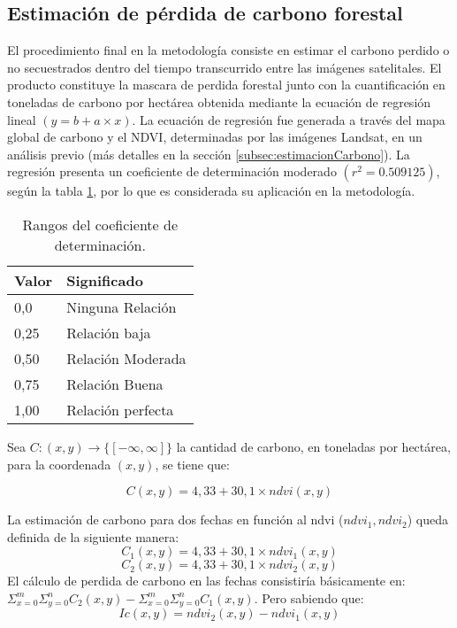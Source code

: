 \subsection{Estimaci\'on de p\'erdida de carbono forestal}
El procedimiento final en la metodolog\'ia consiste en estimar el carbono perdido o no secuestrados dentro del tiempo transcurrido entre las im\'agenes satelitales. El producto constituye la mascara de perdida forestal junto con la cuantificaci\'on en toneladas de carbono por hect\'area obtenida mediante la ecuaci\'on de regresi\'on lineal $(y= b + a \times x) $. La ecuaci\'on de regresi\'on fue generada a trav\'es del mapa global de carbono \cite{saatchi2011benchmark} y el NDVI, determinadas por las im\'agenes Landsat, en un an\'alisis previo (m\'as detalles en la secci\'on \ref{subsec:estimacionCarbono}). La regresi\'on presenta un coeficiente de determinaci\'on moderado $ (r^{2}=0.509125) $, seg\'un la tabla \ref{t:coefDeter}, por lo que es considerada su aplicaci\'on en la metodolog\'ia.
\begin{table}[H]
	\centering
	\begin{tabular}{|l|l|}
		\hline
		\textbf{Valor} & \textbf{Significado} \\ \hline
		0,0            & Ninguna Relaci\'on     \\ \hline
		0,25           & Relaci\'on baja        \\ \hline
		0,50           & Relaci\'on Moderada    \\ \hline
		0,75           & Relaci\'on Buena       \\ \hline
		1,00           & Relaci\'on perfecta    \\ \hline
	\end{tabular}
	\caption{Rangos del coeficiente de determinaci\'on.}
	\label{t:coefDeter}
\end{table}
Sea $ C:(x,y) \longrightarrow \{ [-\infty,\infty]\}$ la cantidad de carbono, en toneladas por hect\'area, para la coordenada $ (x,y) $, se tiene que: 

		\begin{equation}
			C(x,y)=4,33+30,1 \times ndvi(x,y)
		\end{equation}

La estimaci\'on de carbono para dos fechas en funci\'on al ndvi ($ ndvi_{1},ndvi_{2} $) queda definida de la siguiente manera:
		\begin{equation}
		\label{e:fecha1}
		C_{1}(x,y)=4,33+30,1 \times ndvi_{1}(x,y)
		\end{equation}
		\begin{equation}
		\label{e:fecha2}
		C_{2}(x,y)=4,33+30,1 \times ndvi_{2}(x,y)
		\end{equation}
El c\'alculo de perdida de carbono en las fechas consistir\'ia b\'asicamente en: $\Sigma^{m}_{x=0}\Sigma^{n}_{y=0} C_{2}(x,y) - \Sigma^{m}_{x=0}\Sigma^{n}_{y=0} C_{1}(x,y) $. Pero sabiendo que:
		\begin{equation}
		\label{e:indiceCambio}
		Ic(x,y)=ndvi_{2}(x,y) -ndvi_{1}(x,y)
		\end{equation}		

